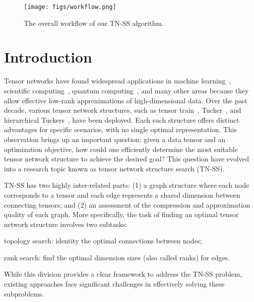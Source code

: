 \begin{figure*}[t]
    \centering
    \texttt{[image: figs/workflow.png]}
    \caption{The overall workflow of our TN-SS algorithm.}
    \label{fig:workflow}
\end{figure*}
%
\section{Introduction}\label{sec:intro}
Tensor networks have found widespread applications in machine learning~\cite{lebedev2014speeding,novikov2015tensorizing,phan2020stable,memmel2022position}, scientific computing~\cite{pmlr-v139-richter21a,PhysRevB.95.045117,PhysRevX.14.011009,ma2024approximate}, quantum computing~\cite{verstraete2008matrix,banuls2023tensor,Montangero_2018}, and many other areas because they allow effective low-rank approximations of high-dimensional data.
%
Over the past decade, various tensor network structures, such as tensor train~\cite{Oseledets_2011}, Tucker~\cite{Tucker_1966}, and hierarchical Tuckers~\cite{ht}, have been deployed. Each such structure offers distinct advantages for specific scenarios, with no single optimal representation.
%
This observation brings up an important question: given a data tensor and an optimization objective, how could one efficiently determine the most suitable tensor network structure to achieve the desired goal?
%
This question have evolved into a research topic known as tensor network structure search (TN-SS).

TN-SS has two highly inter-related parts: (1) a graph structure where each node corresponds to a tensor and each edge represents a shared dimension between connecting tensors; and (2) an assessment of the compression and approximation quality of each graph.
%
More specifically, the task of finding an optimal tensor network structure involves two subtasks:
%
\begin{enumerate*}[label=(\arabic*)]
    \item topology search: identity the optimal connections between nodes;
    \item rank search: find the optimal dimension sizes (also called ranks) for edges.
\end{enumerate*}
%
While this division provides a clear framework to address the TN-SS problem, existing approaches face significant challenges in effectively solving these subproblems.

